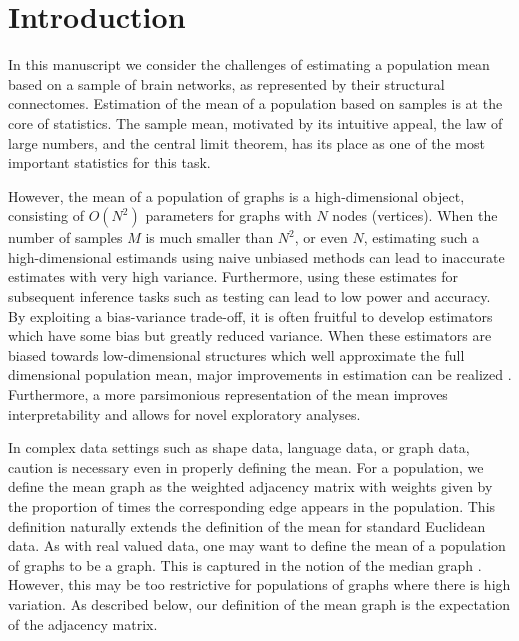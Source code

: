 \documentclass[journal,twoside,web]{ieeecolor}
\begin{document}
\section{Introduction}\label{sec:intro}

In this manuscript we consider the challenges of estimating a population mean based on a sample of brain networks, as represented by their structural connectomes.
Estimation of the mean of a population based on samples is at the core of statistics.
The sample mean, motivated by its intuitive appeal, the law of large numbers, and the central limit theorem, has its place as one of the most important statistics for this task.

However, the mean of a population of graphs is a high-dimensional object, consisting of $O(N^2)$ parameters for graphs with $N$ nodes (vertices).
When the number of samples $M$ is much smaller than $N^2$, or even $N$, estimating such a high-dimensional estimands using naive unbiased methods can lead to inaccurate estimates with very high variance.
Furthermore, using these estimates for subsequent inference tasks such as testing can lead to low power and accuracy.
By exploiting a bias-variance trade-off, it is often fruitful to develop estimators which have some bias but greatly reduced variance.
When these estimators are biased towards low-dimensional structures which well approximate the full dimensional population mean, major improvements in estimation can be realized \cite{trunk1979problem}.
Furthermore, a more parsimonious representation of the mean improves interpretability and allows for novel exploratory analyses.



In complex data settings such as shape data, language data, or graph data, caution is necessary even in properly defining the mean.
For a population, we define the mean graph as the weighted adjacency matrix with weights given by the proportion of times the corresponding edge appears in the population.
This definition naturally extends the definition of the mean for standard Euclidean data.
As with real valued data, one may want to define the mean of a population of graphs to be a graph.
This is captured in the notion of the median graph \cite{jiang2001median}. However, this may be too restrictive for populations of graphs where there is high variation.
As described below, our definition of the mean graph is the expectation of the adjacency matrix.
\end{document}
